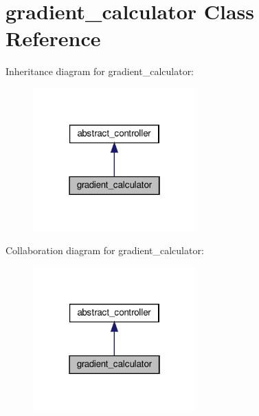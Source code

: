 \hypertarget{classgradient__calculator}{}\section{gradient\+\_\+calculator Class Reference}
\label{classgradient__calculator}


Inheritance diagram for gradient\+\_\+calculator\+:\nopagebreak
\begin{figure}[H]
\begin{center}
\leavevmode
\includegraphics[width=178pt]{classgradient__calculator__inherit__graph}
\end{center}
\end{figure}


Collaboration diagram for gradient\+\_\+calculator\+:\nopagebreak
\begin{figure}[H]
\begin{center}
\leavevmode
\includegraphics[width=178pt]{classgradient__calculator__coll__graph}
\end{center}
\end{figure}
